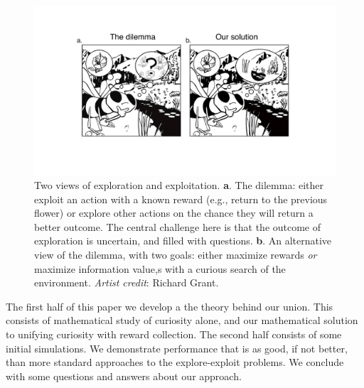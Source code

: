 \begin{figure}
	\begin{fullwidth}
	\includegraphics[width=.9\linewidth]{img/bee.pdf} 
	\caption{Two views of exploration and exploitation. \textbf{a}. The dilemma: either exploit an action with a known reward (e.g., return to the previous flower) or explore other actions on the chance they will return a better outcome. The central challenge here is that the outcome of exploration is uncertain, and filled with questions. \textbf{b}. An alternative view of the dilemma, with two goals: either maximize rewards \textit{or} maximize information value,s with a curious search of the environment. \textit{Artist credit}: Richard Grant.}
	\label{fig:bee} 
	\end{fullwidth}
\end{figure}

The first half of this paper we develop a the theory behind our union. This consists of mathematical study of curiosity alone, and our mathematical solution to unifying curiosity with reward collection. The second half consists of some initial simulations. We demonstrate performance that is as good, if not better, than more standard approaches to the explore-exploit problems. We conclude with some questions and answers about our approach.
